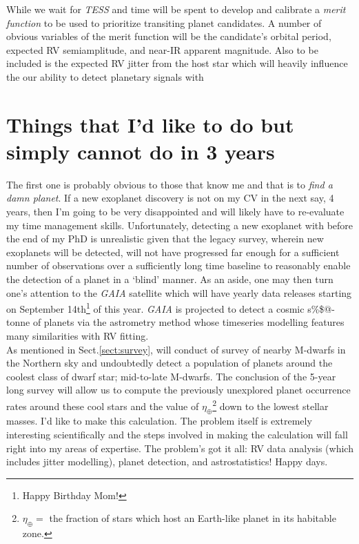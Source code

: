 While we wait for \emph{TESS} and \spirou{,} time will be spent to develop and calibrate a 
\emph{merit function} to be used to prioritize transiting planet candidates. 
A number of obvious variables 
of the merit function will be the candidate's orbital period, expected RV semiamplitude, and 
near-IR apparent magnitude. Also to be included is the expected RV jitter from the host star 
which will heavily influence the our ability to detect planetary signals with 


\section{Things that I'd like to do but simply cannot do in 3 years} \label{sect:liketodo}
The first one is probably obvious to those that know me and that is to 
\emph{find a damn planet}. If a new exoplanet discovery is not on my CV in the 
next say, 4 years, then I'm going to be very disappointed and will likely have to 
re-evaluate my time management skills. Unfortunately, detecting a new exoplanet 
with \spirou{} before the end of my PhD is unrealistic given that the legacy survey, 
wherein new exoplanets will be detected, will not have progressed far enough for a 
sufficient number of observations over a sufficiently long time baseline 
to reasonably enable the detection of a planet in a `blind' 
manner. As an aside, one may then turn one's attention to the \emph{GAIA} satellite 
which will have yearly data releases starting on 
September 14th\footnote{Happy Birthday Mom!} of this year. 
\emph{GAIA} is projected to detect a cosmic s\%\$@-tonne of planets 
\parencite[$\sim 21$ 000;][]{perryman14} via the astrometry method whose timeseries 
modelling features many similarities with RV fitting. \\

As mentioned in Sect.\ref{sect:survey}, \spirou{} will conduct of survey of 
nearby M-dwarfs in the Northern sky and undoubtedly detect a population of planets 
around the coolest class of dwarf star; mid-to-late M-dwarfs. The conclusion of 
the 5-year long survey will allow us to compute the previously unexplored planet 
occurrence 
rates around these cool stars and the value of $\eta_{\oplus}$\footnote{$\eta_{\oplus}=$ 
the fraction of stars 
which host an Earth-like planet in its habitable zone.} down to the lowest stellar 
masses. I'd like to make this calculation. The problem itself is extremely 
interesting scientifically and the steps involved in making the calculation will fall 
right into my areas of expertise. The problem's got it all: 
RV data analysis (which includes jitter modelling), planet detection, 
and astrostatistics! Happy days.

